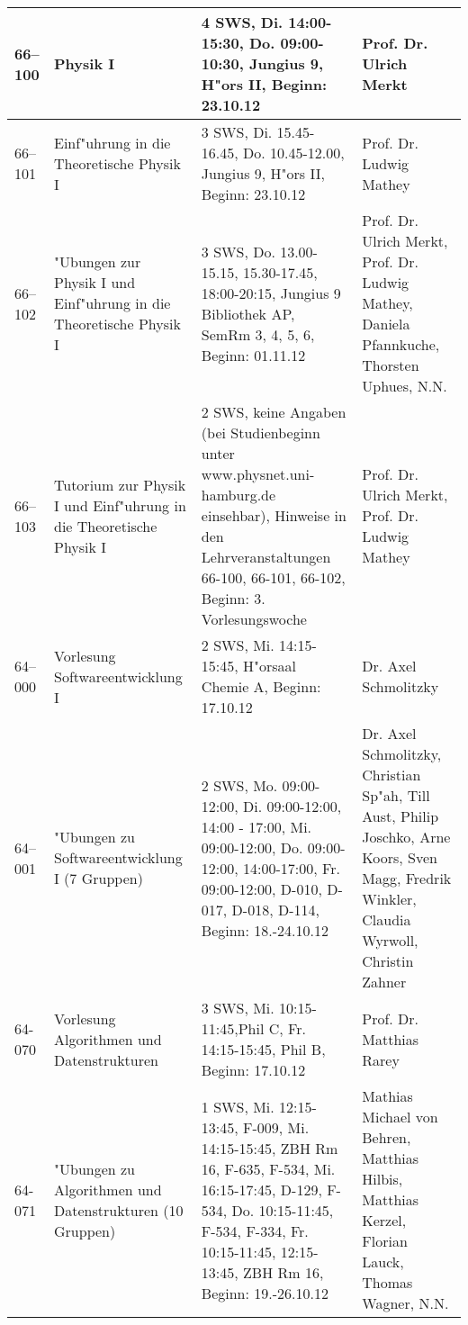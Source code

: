 \begin{tabularx}{\textwidth}{|l|X|X|X|}
%
\hhline{|=|=|=|=|} 66--100 	& Physik I
			& 4 SWS, Di. 14:00-15:30, Do. 09:00-10:30, Jungius 9, H"ors II, Beginn: 23.10.12
			& Prof. Dr. Ulrich Merkt \\
\hline 66--101 	& Einf"uhrung in die Theoretische Physik I
			& 3 SWS, Di. 15.45-16.45, Do. 10.45-12.00, Jungius 9, H"ors II, Beginn: 23.10.12
			& Prof. Dr. Ludwig Mathey \\
\hline 66--102 	& "Ubungen zur Physik I und Einf"uhrung in die Theoretische Physik I
			& 3 SWS, Do. 13.00-15.15, 15.30-17.45, 18:00-20:15, Jungius 9 Bibliothek AP, SemRm 3, 4, 5, 6, Beginn: 01.11.12
			& Prof. Dr. Ulrich Merkt, Prof. Dr. Ludwig Mathey, Daniela Pfannkuche, Thorsten Uphues, N.N. \\
\hline 66--103	& Tutorium zur Physik I und Einf"uhrung in die Theoretische Physik I
			& 2 SWS, keine Angaben (bei Studienbeginn unter www.physnet.uni-hamburg.de einsehbar), Hinweise in den Lehrveranstaltungen 66-100, 66-101, 66-102, Beginn: 3. Vorlesungswoche
			& Prof. Dr. Ulrich Merkt, Prof. Dr. Ludwig Mathey \\

\hhline{|=|=|=|=|} 64--000 & Vorlesung Softwareentwicklung I
			& 2 SWS, Mi. 14:15-15:45, H"orsaal Chemie A, Beginn: 17.10.12
			& Dr. Axel Schmolitzky \\
\hline 64--001 & "Ubungen zu Softwareentwicklung I (7 Gruppen)
			& 2 SWS, Mo. 09:00-12:00, Di. 09:00-12:00, 14:00 - 17:00, Mi. 09:00-12:00, Do. 09:00-12:00, 14:00-17:00, Fr. 09:00-12:00, D-010, D-017, D-018, D-114, Beginn: 18.-24.10.12
			& Dr. Axel Schmolitzky, Christian Sp"ah, Till Aust, Philip Joschko, Arne Koors, Sven Magg, Fredrik Winkler, Claudia Wyrwoll, Christin Zahner \\
\hline 64-070 & Vorlesung Algorithmen und Datenstrukturen
			& 3 SWS, Mi. 10:15-11:45,Phil C, Fr. 14:15-15:45, Phil B, Beginn: 17.10.12
			& Prof. Dr. Matthias Rarey \\
\hline 64-071 & "Ubungen zu Algorithmen und Datenstrukturen (10 Gruppen)
			& 1 SWS, Mi. 12:15-13:45, F-009, Mi. 14:15-15:45, ZBH Rm 16, F-635, F-534, Mi. 16:15-17:45, D-129, F-534, Do. 10:15-11:45, F-534, F-334, Fr. 10:15-11:45, 12:15-13:45, ZBH Rm 16, Beginn: 19.-26.10.12
			& Mathias Michael von Behren, Matthias Hilbis, Matthias Kerzel, Florian Lauck, Thomas Wagner, N.N. \\


\end{tabularx}
